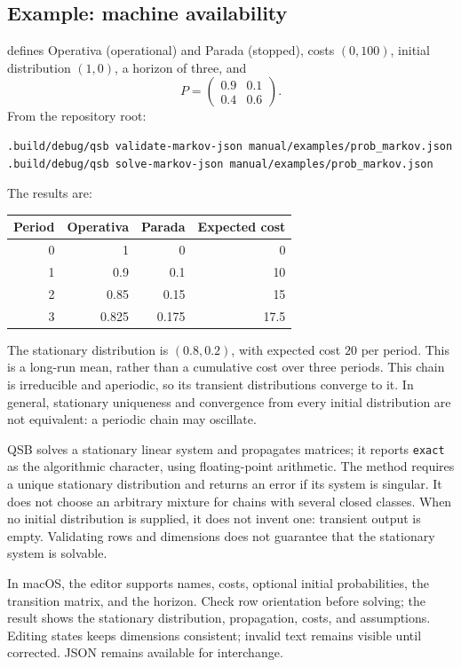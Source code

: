 \subsection{Example: machine availability}
 defines Operativa (operational) and
Parada (stopped), costs \((0,100)\), initial distribution \((1,0)\), a
horizon of three, and
\[
 P=\begin{pmatrix}0.9&0.1\\0.4&0.6\end{pmatrix}.
\]
From the repository root:
\begin{lstlisting}
.build/debug/qsb validate-markov-json manual/examples/prob_markov.json
.build/debug/qsb solve-markov-json manual/examples/prob_markov.json
\end{lstlisting}
The results are:
\begin{center}
\begin{tabular}{rrrr}
\toprule
Period & Operativa & Parada & Expected cost \\
\midrule
0 & 1 & 0 & 0 \\
1 & 0.9 & 0.1 & 10 \\
2 & 0.85 & 0.15 & 15 \\
3 & 0.825 & 0.175 & 17.5 \\
\bottomrule
\end{tabular}
\end{center}
The stationary distribution is \((0.8,0.2)\), with expected cost \(20\)
per period. This is a long-run mean, rather than a cumulative cost over three
periods. This chain is irreducible and aperiodic, so its transient distributions
converge to it. In general, stationary uniqueness and convergence from every
initial distribution are not equivalent: a periodic chain may oscillate.

QSB solves a stationary linear system and propagates matrices; it reports
\texttt{exact} as the algorithmic character, using floating-point arithmetic.
The method requires a unique stationary distribution and returns an error if
its system is singular. It does not choose an arbitrary mixture for chains
with several closed classes. When no initial distribution is supplied, it
does not invent one: transient output is empty. Validating rows and dimensions
does not guarantee that the stationary system is solvable.

In macOS, the editor supports names, costs, optional initial probabilities,
the transition matrix, and the horizon. Check row orientation before solving;
the result shows the stationary distribution, propagation, costs, and
assumptions. Editing states keeps dimensions consistent; invalid text remains
visible until corrected. JSON remains available for interchange.

